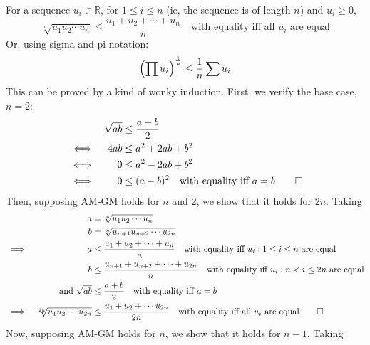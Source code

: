 \documentclass[fleqn,a4paper,11pt]{article}
\begin{document}
    For a sequence \(u_i \in \mathbb R\), for \(1 \le i \le n\) (ie, the
    sequence is of length \(n\)) and \(u_i \ge 0\),
    \begin{equation*}
    \sqrt[n]{u_1 u_2 \dotsm u_n} \le \frac{u_1 + u_2 + \dotsb + u_n}{n}
        \quad \text{with equality iff all \(u_i\) are equal}
    \end{equation*}
    Or, using sigma and pi notation:
    \begin{equation}
    \pqty{\prod u_i}^\frac{1}{n} \le \frac{1}{n}\sum u_i
    \end{equation}
    This can be proved by a kind of wonky induction. First, we verify the base
    case, \(n = 2\):
    \begin{alignat*}{2}
    &&\sqrt{ab} &\le \frac{a + b}{2} \\
    &\iff& 4ab &\le a^2 + 2ab + b^2 \\
    &\iff& 0 &\le a^2 - 2ab + b^2 \\
    &\iff& 0 &\le (a - b)^2\quad \text{with equality iff \(a = b\)} \qed
    \end{alignat*}
    Then, supposing AM-GM holds for \(n\) and 2, we show that it holds for
    \(2n\).  Taking
    \begin{alignat*}{2}
    &&a &= \sqrt[n]{u_1 u_2 \dotsm u_n} \\
    &&b &= \sqrt[n]{u_{n+1} u_{n+2} \dotsm u_{2n}} \\
    &\implies& a &\le \frac{u_1 + u_2 + \dotsb + u_n}{n}
            \quad \text{with equality iff \(u_i: 1 \le i \le n\) are equal}\\
    &&b &\le \frac{u_{n + 1} + u_{n + 2} + \dotsb + u_{2n}}{n}
            \quad \text{with equality iff \(u_i: n < i \le 2n\) are equal}\\
    &&\text{and}\ \sqrt{ab} &\le \frac{a + b}{2}
        \quad \text{with equality iff \(a = b\)}\\
    &\implies& \sqrt[2n]{u_1 u_2 \dotsm u_{2n}} &\le
             \frac{u_1 + u_2 + \dotsb u_{2n}}{2n}
                \quad \text{with equality iff all \(u_i\) are equal}\qed
    \end{alignat*}
    Now, supposing AM-GM holds for \(n\), we show that it holds for \(n - 1\).
    Taking
\end{document}
